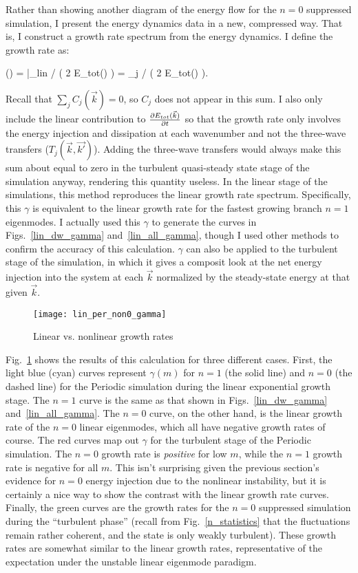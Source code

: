 Rather than showing another diagram of the energy flow for the $n=0$ suppressed simulation, I present the energy dynamics data in a new, compressed way. That is, I construct a growth rate
spectrum from the energy dynamics. I define the growth rate as:

\beq
\label{gamma_def}
\gamma() =  \bigg|_{lin} \bigg/ \left( 2 E_{tot}() \right) = \sum_j  \bigg/ \left( 2 E_{tot}() \right).
\eeq

Recall that $\sum_j C_j(\vec{k}) = 0$, so $C_j$ does not appear in this sum. I also only include the linear contribution to $ \frac{\partial E_{tot}({\vec{k}})}{\partial t}$ so that the growth rate
only involves the energy injection and dissipation at each wavenumber and not the three-wave transfers ($T_j(\vec{k},\vec{k'})$). 
Adding the three-wave transfers would always make this sum about equal to zero in the turbulent
quasi-steady state stage of the simulation anyway, rendering this quantity useless. 
In the linear stage of the simulations, this method reproduces the linear growth rate spectrum.
Specifically, this $\gamma$ is equivalent to the linear growth rate for the fastest growing branch $n=1$ eigenmodes.
I actually used this $\gamma$ to generate the curves in Figs.~\ref{lin_dw_gamma} and~\ref{lin_all_gamma}, though I used other methods to confirm the accuracy of this calculation.
$\gamma$ can also be applied to the turbulent stage of the simulation, in which it gives a composit look at the net energy injection into the system at each $\vec{k}$ normalized
by the steady-state energy at that given $\vec{k}$.

\begin{figure}[!ht]
\centerline{\texttt{[image: lin\_per\_non0\_gamma]}}
\caption{Linear vs. nonlinear growth rates}
\label{lin_per_non0_gamma}
\end{figure}

Fig.~\ref{lin_per_non0_gamma} shows the results of this calculation for three different cases. First, the light blue (cyan) curves represent $\gamma(m)$ for $n=1$ (the solid line)
and $n=0$ (the dashed line) for the Periodic simulation during the linear exponential growth stage. The $n=1$ curve is the same as that shown in Figs.~\ref{lin_dw_gamma} and~\ref{lin_all_gamma}.
The $n=0$ curve, on the other hand, is the linear growth rate of the $n=0$ linear eigenmodes, which all have negative growth rates of course. The red curves map out $\gamma$ for the 
turbulent stage of the Periodic simulation. The $n=0$ growth rate is \emph{positive} for low $m$, while the $n=1$ growth rate is negative for all $m$. This isn't surprising given the
previous section's evidence for $n=0$ energy injection due to the nonlinear instability, but it is certainly a nice way to show the contrast with the linear growth rate curves.
Finally, the green curves are the growth rates for the $n=0$ suppressed simulation during the ``turbulent phase'' (recall from Fig.~\ref{n_statistics} that the fluctuations remain rather
coherent, and the state is only weakly turbulent). 
These growth rates are somewhat similar to the linear growth rates, representative of the expectation under the unstable linear eigenmode paradigm. 

